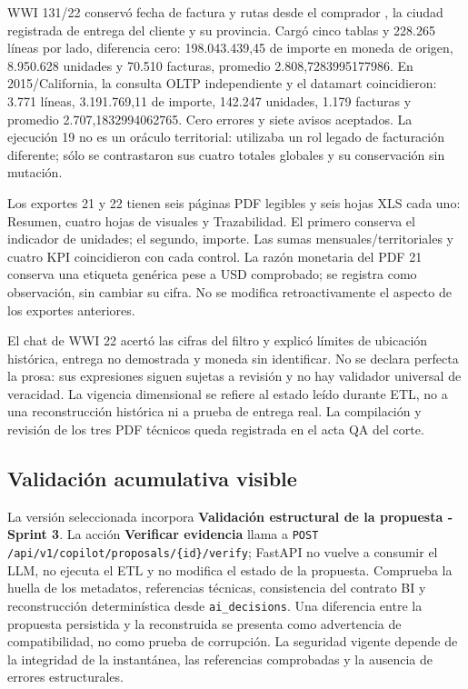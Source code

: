 \documentclass[11pt,letterpaper]{article}
\newcommand{\file}[1]{\texttt{#1}}
\begin{document}
WWI 131/22 conservó fecha de factura y rutas desde el comprador
, la ciudad registrada de entrega del cliente
 y su provincia. Cargó cinco tablas y
228.265 líneas por lado, diferencia cero: 198.043.439,45 de importe en moneda de
origen, 8.950.628 unidades y 70.510 facturas, promedio 2.808,7283995177986.
En 2015/California, la consulta OLTP independiente y el datamart coincidieron:
3.771 líneas, 3.191.769,11 de importe, 142.247 unidades, 1.179 facturas y promedio
2.707,1832994062765. Cero errores y siete avisos aceptados. La ejecución 19 no
es un oráculo territorial: utilizaba un rol legado de facturación diferente;
sólo se contrastaron sus cuatro totales globales y su conservación sin mutación.

Los exportes 21 y 22 tienen seis páginas PDF legibles y seis hojas XLS cada uno:
Resumen, cuatro hojas de visuales y Trazabilidad. El primero conserva el indicador
de unidades; el segundo, importe. Las sumas mensuales/territoriales y cuatro KPI
coincidieron con cada control. La razón monetaria del PDF 21 conserva una etiqueta
genérica pese a USD comprobado; se registra como observación, sin cambiar su cifra.
No se modifica retroactivamente el aspecto de los exportes anteriores.

El chat de WWI 22 acertó las cifras del filtro y explicó límites de ubicación
histórica, entrega no demostrada y moneda sin identificar. No se declara perfecta
la prosa: sus expresiones siguen sujetas a revisión y no hay validador universal
de veracidad. La vigencia dimensional se refiere al estado leído durante ETL,
no a una reconstrucción histórica ni a prueba de entrega real. La compilación y
revisión de los tres PDF técnicos queda registrada en el acta QA del corte.

\subsection{Validación acumulativa visible}

La versión seleccionada incorpora \textbf{Validación estructural de la propuesta - Sprint 3}. La acción \textbf{Verificar evidencia} llama a \file{POST /api/v1/copilot/proposals/\{id\}/verify}; FastAPI no vuelve a consumir el LLM, no ejecuta el ETL y no modifica el estado de la propuesta. Comprueba la huella de los metadatos, referencias técnicas, consistencia del contrato BI y reconstrucción determinística desde \file{ai\_decisions}. Una diferencia entre la propuesta persistida y la reconstruida se presenta como advertencia de compatibilidad, no como prueba de corrupción. La seguridad vigente depende de la integridad de la instantánea, las referencias comprobadas y la ausencia de errores estructurales.
\end{document}
